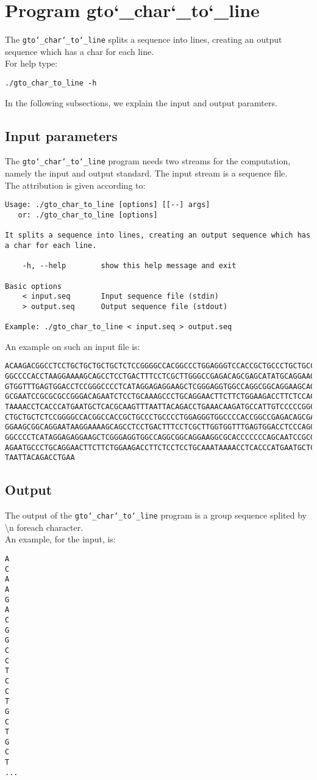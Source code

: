 \section{Program gto\char`_char\char`_to\char`_line}
The \texttt{gto\char`_char\char`_to\char`_line} splits a sequence into lines, creating an output sequence which has a char for each line.\\
For help type:
\begin{lstlisting}
./gto_char_to_line -h
\end{lstlisting}
In the following subsections, we explain the input and output paramters.

\subsection*{Input parameters}

The \texttt{gto\char`_char\char`_to\char`_line} program needs two streams for the computation,
namely the input and output standard. The input stream is a sequence file.\\
The attribution is given according to:
\begin{lstlisting}
Usage: ./gto_char_to_line [options] [[--] args]
   or: ./gto_char_to_line [options]

It splits a sequence into lines, creating an output sequence which has a char for each line.

    -h, --help        show this help message and exit

Basic options
    < input.seq       Input sequence file (stdin)
    > output.seq      Output sequence file (stdout)

Example: ./gto_char_to_line < input.seq > output.seq
\end{lstlisting}
An example on such an input file is:
\begin{lstlisting}
ACAAGACGGCCTCCTGCTGCTGCTGCTCTCCGGGGCCACGGCCCTGGAGGGTCCACCGCTGCCCTGCTGCCATTGTCCCC
GGCCCCACCTAAGGAAAAGCAGCCTCCTGACTTTCCTCGCTTGGGCCGAGACAGCGAGCATATGCAGGAAGCGGCAGGAA
GTGGTTTGAGTGGACCTCCGGGCCCCTCATAGGAGAGGAAGCTCGGGAGGTGGCCAGGCGGCAGGAAGCAGGCCAGTGCC
GCGAATCCGCGCGCCGGGACAGAATCTCCTGCAAAGCCCTGCAGGAACTTCTTCTGGAAGACCTTCTCCACCCCCCCAGC
TAAAACCTCACCCATGAATGCTCACGCAAGTTTAATTACAGACCTGAAACAAGATGCCATTGTCCCCCGGCCTCCTGCTG
CTGCTGCTCTCCGGGGCCACGGCCACCGCTGCCCTGCCCCTGGAGGGTGGCCCCACCGGCCGAGACAGCGAGCATATGCA
GGAAGCGGCAGGAATAAGGAAAAGCAGCCTCCTGACTTTCCTCGCTTGGTGGTTTGAGTGGACCTCCCAGGCCAGTGCCG
GGCCCCTCATAGGAGAGGAAGCTCGGGAGGTGGCCAGGCGGCAGGAAGGCGCACCCCCCCAGCAATCCGCGCGCCGGGAC
AGAATGCCCTGCAGGAACTTCTTCTGGAAGACCTTCTCCTCCTGCAAATAAAACCTCACCCATGAATGCTCACGCAAGTT
TAATTACAGACCTGAA
\end{lstlisting}

\subsection*{Output}
The output of the \texttt{gto\char`_char\char`_to\char`_line} program is a group sequence splited by \textbackslash n foreach character.\\
An example, for the input, is:
\begin{lstlisting}
A
C
A
A
G
A
C
G
G
C
C
T
C
C
T
G
C
T
G
C
T
...
\end{lstlisting}